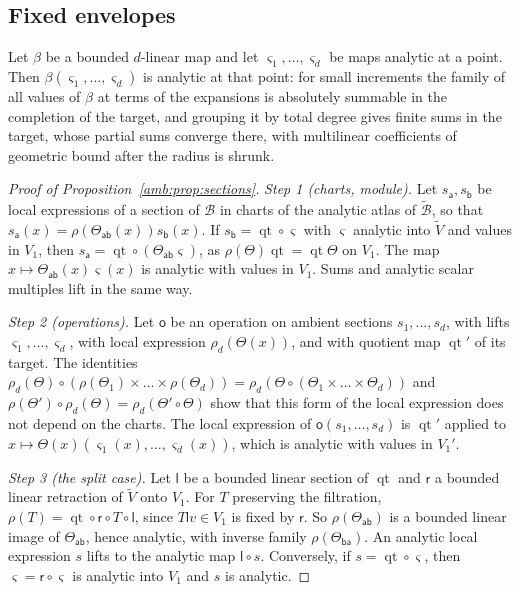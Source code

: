 \documentclass[11pt]{amsart}
\theoremstyle{definition}
\theoremstyle{remark}
\numberwithin{equation}{section}
\theoremstyle{plain}
\theoremstyle{definition}
\theoremstyle{plain}
\begin{document}
\subsection{Fixed envelopes}\label{amb:ssec:proofs-fixed}

Let $\beta$ be a bounded $d$\nobreakdash-linear map and let $\varsigma_1,\dots,\varsigma_d$ be maps analytic at a point. Then $\beta(\varsigma_1,\dots,\varsigma_d)$ is analytic at that point: for small increments the family of all values of $\beta$ at terms of the expansions is absolutely summable in the completion of the target, and grouping it by total degree gives finite sums in the target, whose partial sums converge there, with multilinear coefficients of geometric bound after the radius is shrunk.

\begin{proof}[Proof of Proposition~\ref{amb:prop:sections}]
\emph{Step 1 (charts, module).} Let $s_{\mathsf a},s_{\mathsf b}$ be local expressions of a section of $\mathcal B$ in charts of the analytic atlas of $\widetilde{\mathcal B}$, so that $s_{\mathsf a}(x)=\rho(\Theta_{\mathsf{ab}}(x))s_{\mathsf b}(x)$. If $s_{\mathsf b}=\operatorname{qt}\circ\varsigma$ with $\varsigma$ analytic into $\tilde V$ and values in $V_1$, then $s_{\mathsf a}=\operatorname{qt}\circ(\Theta_{\mathsf{ab}}\varsigma)$, as $\rho(\Theta)\operatorname{qt}=\operatorname{qt}\Theta$ on $V_1$. The map $x\mapsto\Theta_{\mathsf{ab}}(x)\varsigma(x)$ is analytic with values in $V_1$. Sums and analytic scalar multiples lift in the same way.

\emph{Step 2 (operations).} Let $\mathsf o$ be an operation on ambient sections $s_1,\dots,s_d$, with lifts $\varsigma_1,\dots,\varsigma_d$, with local expression $\rho_d(\Theta(x))$, and with quotient map $\operatorname{qt}'$ of its target. The identities $\rho_d(\Theta)\circ(\rho(\Theta_1)\times\dots\times\rho(\Theta_d))=\rho_d(\Theta\circ(\Theta_1\times\dots\times\Theta_d))$ and $\rho(\Theta')\circ\rho_d(\Theta)=\rho_d(\Theta'\circ\Theta)$ show that this form of the local expression does not depend on the charts. The local expression of $\mathsf o(s_1,\dots,s_d)$ is $\operatorname{qt}'$ applied to $x\mapsto\Theta(x)(\varsigma_1(x),\dots,\varsigma_d(x))$, which is analytic with values in $V_1'$.

\emph{Step 3 (the split case).} Let $\mathsf l$ be a bounded linear section of $\operatorname{qt}$ and $\mathsf r$ a bounded linear retraction of $\tilde V$ onto $V_1$. For $T$ preserving the filtration, $\rho(T)=\operatorname{qt}\circ\mathsf r\circ T\circ\mathsf l$, since $T\mathsf lv\in V_1$ is fixed by $\mathsf r$. So $\rho(\Theta_{\mathsf{ab}})$ is a bounded linear image of $\Theta_{\mathsf{ab}}$, hence analytic, with inverse family $\rho(\Theta_{\mathsf{ba}})$. An analytic local expression $s$ lifts to the analytic map $\mathsf l\circ s$. Conversely, if $s=\operatorname{qt}\circ\varsigma$, then $\varsigma=\mathsf r\circ\varsigma$ is analytic into $V_1$ and $s$ is analytic.
\end{proof}
\end{document}
